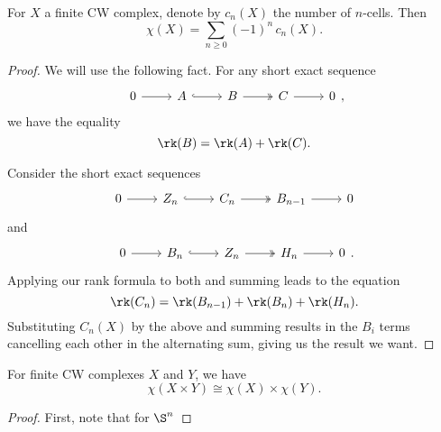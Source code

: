 \documentclass[main.tex]{subfiles}
\begin{document}
\begin{proposition}
  For \(X\) a finite CW complex, denote by \(c_{n}(X)\) the number of \(n\)-cells. Then
  \begin{equation*}
    \chi(X) = \sum_{n \geq 0} (-1)^{n}\,c_{n}(X).
  \end{equation*}
\end{proposition}
\begin{proof}
  We will use the following fact. For any short exact sequence
  \begin{equation*}
    \begin{tikzcd}
      0
      \arrow[r]
      & A
      \arrow[r, hook]
      & B
      \arrow[r, two heads]
      & C
      \arrow[r]
      & 0
    \end{tikzcd},
  \end{equation*}
  we have the equality
  \begin{equation*}
    \rk(B) = \rk(A) + \rk(C).
  \end{equation*}

  Consider the short exact sequences
  \begin{equation*}
    \begin{tikzcd}
      0
      \arrow[r]
      & Z_{n}
      \arrow[r, hook]
      & C_{n}
      \arrow[r, two heads]
      & B_{n-1}
      \arrow[r]
      & 0
    \end{tikzcd}
  \end{equation*}
  and
  \begin{equation*}
    \begin{tikzcd}
      0
      \arrow[r]
      & B_{n}
      \arrow[r, hook]
      & Z_{n}
      \arrow[r, two heads]
      & H_{n}
      \arrow[r]
      & 0
    \end{tikzcd}.
  \end{equation*}
  Applying our rank formula to both and summing leads to the equation
  \begin{equation*}
    \rk(C_{n}) = \rk(B_{n-1}) + \rk(B_{n}) + \rk(H_{n}).
  \end{equation*}
  Substituting \(C_{n}(X)\) by the above and summing results in the \(B_{i}\) terms cancelling each other in the alternating sum, giving us the result we want.
\end{proof}

\begin{proposition}
  For finite CW complexes \(X\) and \(Y\), we have
  \begin{equation*}
    \chi(X \times Y) \cong \chi(X) \times \chi(Y).
  \end{equation*}
\end{proposition}
\begin{proof}
  First, note that for \(\S^{n}\)
\end{proof}
\end{document}

